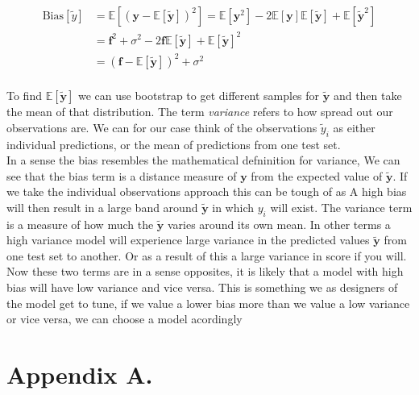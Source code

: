 \documentclass[twoside,11pt]{report}
\begin{document}
\begin{align*}
\mathrm{Bias}[\tilde{y}]& =\mathbb{E}\left[\left(\boldsymbol{y}-\mathbb{E}\left[\boldsymbol{\tilde{y}}\right]\right)^2\right] = \mathbb{E}[\boldsymbol{y}^2] - 2\mathbb{E}[\boldsymbol{y}]\mathbb{E}[\boldsymbol{\tilde{y}}] + \mathbb{E}[\boldsymbol{\tilde{y}}^2]\\
& = \boldsymbol{f}^2 + \sigma^2 - 2\boldsymbol{f}\mathbb{E}[\boldsymbol{\tilde{y}}] + \mathbb{E}[\boldsymbol{\tilde{y}}]^2\\
& = (\boldsymbol{f} - \mathbb{E}[\boldsymbol{\tilde{y}}])^2 + \sigma^2\\
\end{align*}


To find $\mathbb{E}[\boldsymbol{\tilde{y}}]$ we can use bootstrap to get different samples for $\boldsymbol{\tilde{y}}$ and then take the mean of that distribution.
The term \emph{variance} refers to how spread out our observations are. We can for our case think of the observations $\tilde{y}_i$
as either individual predictions, or the mean of predictions from one test set.\\
In a sense the bias resembles the mathematical defninition for variance, We can see that the bias term is a distance measure of $\boldsymbol{y}$ from the expected value of $\boldsymbol{\tilde{y}}$. If we take the individual observations approach this can be tough of as A high bias will then result in a large band around $\boldsymbol{\tilde{y}}$ in which $y_i$ will exist. The variance term is a measure of how much the $\boldsymbol{\tilde{y}}$ varies around its own mean. In other terms a high variance model will experience large variance in the predicted values $\boldsymbol{\tilde{y}}$ from one test set to another. Or as a result of this a large variance in score if you will. Now these two terms are in a sense opposites, it is likely that a model with high bias will have low variance and vice versa. This is something we as designers of the model get to tune, if we value a lower bias more than we value a low variance or vice versa, we can choose a model acordingly

\acks{}


\newpage

\appendix
\section*{Appendix A.}
\label{app:theorem}




\vskip 0.2in

% 

\end{document}
